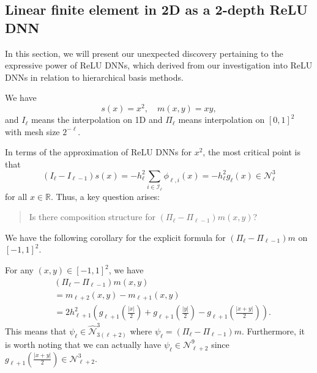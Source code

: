 \subsection{Linear finite element in 2D as a 2-depth ReLU DNN}\label{sec:2DFEMandDNN}
In this section, we will present our unexpected discovery pertaining to the
expressive power of ReLU DNNs, which derived from our investigation into ReLU DNNs 
in relation to hierarchical basis methods.

We have
$$
s(x) = x^2, \quad m(x,y) = xy,
$$
and 
$I_{\ell}$ means the interpolation on 1D and $\Pi_\ell$ means interpolation
on $[0,1]^2$ with mesh size $2^{-\ell}$.

In terms of the approximation of ReLU DNNs for $x^2$,
the most critical point is that
\begin{equation}\label{key}
	(I_{\ell} - I_{\ell-1})s(x) = -h_\ell^2\sum_{i\in \mathcal I_\ell}\phi_{\ell,i}(x) = -h_\ell^2g_\ell(x) \in {\mathcal N}_\ell^3
\end{equation}
for all $x\in \mathbb{R}$. Thus, a key question arises:
\begin{quote}
	Is there composition structure for $(\Pi_\ell - \Pi_{\ell-1})m (x, y)$?
\end{quote}

We have the following 
corollary for the explicit formula for $(\Pi_\ell- \Pi_{\ell-1})m$ on $[-1,1]^2$.
\begin{corollary}
	For any $(x,y) \in [-1,1]^2$, we have
	\begin{equation}\label{eq:Pi-Pi}
		\begin{aligned}
			&(\Pi_\ell- \Pi_{\ell-1})m (x,y) \\
			&= m_{\ell+2}(x,y) - m_{\ell+1}(x,y)  \\
			&= 2h^2_{\ell+1}\left(g_{\ell+1}\left(\frac{|x|}{2}\right)+g_{\ell+1}\left(\frac{|y|}{2}\right)-g_{\ell+1}\left(\frac{|x+y|}{2}\right)\right).
		\end{aligned}
	\end{equation}
	This means that $\psi_\ell \in \widehat{{\mathcal N}}_{3(\ell+2)}^3$ where $\psi_\ell = (\Pi_\ell- \Pi_{\ell-1})m$. Furthermore, 
	it is worth noting that we can actually have $\psi_\ell \in {\mathcal N}_{\ell+2}^9$ since $g_{\ell+1}(\frac{|x+y|}{2}) \in {\mathcal N}_{\ell+2}^3$.
\end{corollary}

